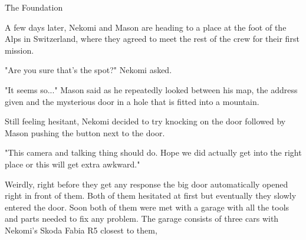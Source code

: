 \h{The Foundation}

A few days later, Nekomi and Mason are heading to a place at the foot of the Alps in Switzerland, where they agreed to meet the rest of the crew for their first mission. 

"Are you sure that's the spot?" Nekomi asked. 

"It seems so..." Mason said as he repeatedly looked between his map, the address given and the mysterious door in a hole that is fitted into a mountain. 

Still feeling hesitant, Nekomi decided to try knocking on the door followed by Mason pushing the button next to the door. 

"This camera and talking thing should do. Hope we did actually get into the right place or this will get extra awkward."

Weirdly, right before they get any response the big door automatically opened right in front of them. 
Both of them hesitated at first but eventually they slowly entered the door. 
Soon both of them were met with a garage with all the tools and parts needed to fix any problem. 
The garage consists of three cars with Nekomi's Skoda Fabia R5 closest to them, 
